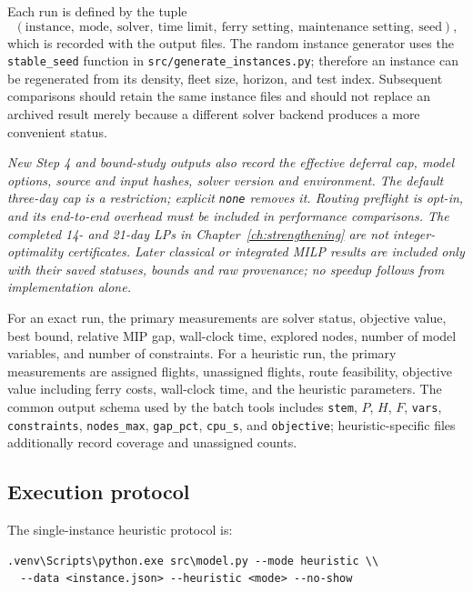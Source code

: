 Each run is defined by the tuple
\begin{equation}
    (\text{instance},\ \text{mode},\ \text{solver},\ \text{time limit},\
    \text{ferry setting},\ \text{maintenance setting},\ \text{seed}),
\end{equation}
which is recorded with the output files. The random instance generator uses
the \texttt{stable\_seed} function in
\texttt{src/generate\_instances.py}; therefore
an instance can be regenerated from its density, fleet size, horizon, and test
index. Subsequent comparisons should retain the same instance files and should
not replace an archived result merely because a different solver backend
produces a more convenient status.

\textit{New Step 4 and bound-study outputs also record the effective deferral
cap, model options, source and input hashes, solver version and environment.
The default three-day cap is a restriction; explicit \texttt{none} removes it.
Routing preflight is opt-in, and its end-to-end overhead must be included in
performance comparisons. The completed 14- and 21-day LPs in
Chapter~\ref{ch:strengthening} are not integer-optimality certificates. Later
classical or integrated MILP results are included only with their saved statuses,
bounds and raw provenance; no speedup follows from implementation alone.}

For an exact run, the primary measurements are solver status, objective value,
best bound, relative MIP gap, wall-clock time, explored nodes, number of model
variables, and number of constraints. For a heuristic run, the primary
measurements are assigned flights, unassigned flights, route feasibility,
objective value including ferry costs, wall-clock time, and the heuristic
parameters. The common output schema used by the batch tools includes
\texttt{stem}, $P$, $H$, $F$, \texttt{vars}, \texttt{constraints},
\texttt{nodes\_max}, \texttt{gap\_pct}, \texttt{cpu\_s}, and \texttt{objective};
heuristic-specific files additionally record coverage and unassigned counts.

\subsection{Execution protocol}

The single-instance heuristic protocol is:

\begin{verbatim}
.venv\Scripts\python.exe src\model.py --mode heuristic \\
  --data <instance.json> --heuristic <mode> --no-show
\end{verbatim}

